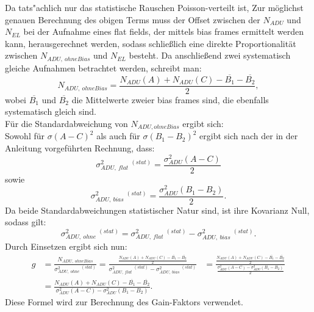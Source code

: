 Da tats"achlich nur das statistische Rauschen Poisson-verteilt ist, Zur möglichst genauen Berechnung des obigen Terms muss der Offset zwischen der $N_{ADU}$ und $N_{EL}$ bei der Aufnahme eines flat fields, der mittels bias frames ermittelt werden kann, herausgerechnet werden, sodass schließlich eine direkte Proportionalität zwischen $N_{ADU,\ ohneBias}$ und $N_{EL}$ besteht. 
Da anschließend zwei systematisch gleiche Aufnahmen betrachtet werden, schreibt man: 
\begin{equation}
N_{ADU,\ ohneBias} = \frac{N_{ADU}(A) + N_{ADU}(C) - \overline{B_1} - \overline{B_2}}{2}, 
\end{equation}
wobei $\overline{B_1}$ und $\overline{B_2}$ die Mittelwerte zweier bias frames sind, die ebenfalls systematisch gleich sind. \\
Für die Standardabweichung von $N_{ADU, ohneBias}$ ergibt sich: \\
Sowohl für $\sigma(A-C)^2$ als auch für $\sigma(B_1 - B_2)^2$ ergibt sich nach der in der Anleitung vorgeführten Rechnung, dass:
\begin{equation}
\sigma_{ADU,\ flat}^2 \ ^{(stat)} = \frac{\sigma_{ADU}^2(A-C)}{2}
\end{equation}
sowie
\begin{equation}
\sigma_{ADU,\ bias}^2 \ ^{(stat)} = \frac{\sigma_{ADU}^2(B_1-B_2)}{2}.
\end{equation}
Da beide Standardabweichungen statistischer Natur sind, ist ihre Kovarianz Null, sodass gilt: 
\begin{equation}
\sigma_{ADU, \ ohne}^2  \ ^{(stat)}=  \sigma_{ADU,\ flat}^2 \ ^{(stat)} - \sigma_{ADU,\ bias}^2 \ ^{(stat)}.
\end{equation}
Durch Einsetzen ergibt sich nun: 
\begin{align}
g &= \frac{N_{ADU,\ ohneBias}}{\sigma_{ADU, \ ohne}^2  \ ^{(stat)}} = \frac{\frac{N_{ADU}(A) + N_{ADU}(C) - \overline{B_1} - \overline{B_2}}{2}}{\sigma_{ADU,\ flat}^2 \ ^{(stat)} - \sigma_{ADU,\ bias}^2 \ ^{(stat)}} &=\frac{\frac{N_{ADU}(A) + N_{ADU}(C) - \overline{B_1} - \overline{B_2}}{2}}{\frac{\sigma_{ADU}^2(A-C) - \sigma_{ADU}^2(B_1-B_2)}{2}} \nonumber\\
&= \frac{N_{ADU}(A) + N_{ADU}(C) - \overline{B_1} - \overline{B_2}}{\sigma_{ADU}^2(A-C) - \sigma_{ADU}^2(B_1-B_2)}.\
\label{form:gain}
\end{align}
Diese Formel wird zur Berechnung des Gain-Faktors verwendet. 

